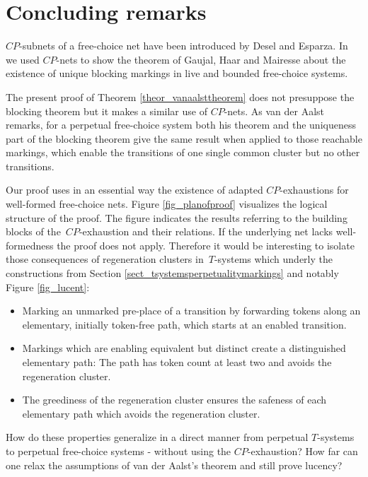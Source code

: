 \documentclass{fundam}
\begin{document}
\section{Concluding remarks}\label{sect_finalremarks}

$CP$-subnets of a free-choice net have been introduced by Desel and Esparza. In \cite{Wehler2010} we used $CP$-nets to show the theorem of Gaujal, Haar and Mairesse about the existence of unique blocking markings in live and bounded free-choice systems.

The present proof of Theorem \ref{theor_vanaalsttheorem} does not presuppose the blocking theorem but it makes a similar use of $CP$-nets. As van der Aalst remarks, for a perpetual free-choice system both his theorem and the uniqueness part of the blocking theorem give the same result when applied to those reachable markings, which enable the transitions of one single common cluster but no other transitions.\bigskip

Our proof uses in an essential way the existence of adapted $CP$-exhaustions for well-formed free-choice nets. Figure \ref{fig_planofproof} visualizes the logical structure of the proof. The figure indicates the results referring to the building blocks of \mbox{the $CP$-exhaustion} and their relations. If the underlying net lacks well-formedness the proof does not apply. Therefore it would be interesting to isolate those consequences of regeneration clusters \mbox{in $T$-systems} which underly the constructions from Section \ref{sect_tsystemsperpetualitymarkings} and notably Figure \ref{fig_lucent}:
\begin{itemize}
\item Marking an unmarked pre-place of a transition by forwarding tokens along an elementary, initially token-free path, which starts at an enabled transition.
\item Markings which are enabling equivalent but distinct create a distinguished elementary path: The path has token count at least two and avoids the regeneration cluster.
\item The greediness of the regeneration cluster ensures the safeness of each elementary path which avoids the regeneration cluster.
\end{itemize}
How do these properties generalize in a direct manner from perpetual $T$-systems to perpetual free-choice systems - without using the $CP$-exhaustion? How far can one relax the assumptions of van der Aalst's theorem and still prove lucency?
\end{document}
